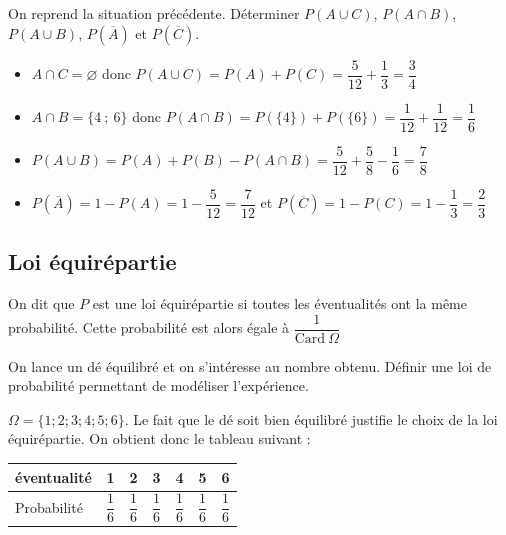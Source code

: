 \documentclass[french]{book}
\newcommand{\barre}[1]{\overline{#1}}
\begin{document}
\begin{exemple}
On reprend la situation pr\'ec\'edente.
D\'eterminer $P(A\cup C)$, $P(A\cap B)$, $P(A\cup B)$, $P(\barre{A})$ et $P(\barre{C})$.
\end{exemple}


\begin{itemize}
\item $A\cap C = \varnothing$ donc $P(A\cup C) = P(A)+P(C)= \dfrac{5}{12}+\dfrac{1}{3} = \dfrac{3}{4}$
\item $A \cap B = \{4~;~6\}$ donc $P(A\cap B) = P(\{4\})+P(\{6\}) = \dfrac{1}{12}+\dfrac{1}{12} = \dfrac{1}{6}$
\item $P(A\cup B) = P(A)+P(B)-P(A\cap B) = \dfrac{5}{12}+\dfrac{5}{8}-\dfrac{1}{6} = \dfrac{7}{8}$
\item $P(\barre{A}) = 1-P(A) = 1-\dfrac{5}{12} = \dfrac{7}{12}$
\quad et \quad $P(\barre{C}) = 1-P(C) = 1-\dfrac{1}{3} = \dfrac{2}{3}$
\end{itemize}


\subsection{Loi \'equir\'epartie}
\begin{defn}
On dit que $P$ est une loi \'equir\'epartie si toutes les \'eventualit\'es ont la m\^eme probabilit\'e. Cette probabilit\'e est alors \'egale à $\dfrac{1}{\text{Card}\ \Omega}$
\end{defn}

\begin{exemple}
On lance un d\'e \'equilibr\'e et on s'int\'eresse au nombre obtenu. D\'efinir une loi de probabilit\'e permettant de mod\'eliser l'exp\'erience.
\end{exemple}


$\Omega=\{1;2;3;4;5;6\}$. Le fait que le d\'e soit bien \'equilibr\'e justifie le choix de la loi \'equir\'epartie. On obtient donc le tableau suivant :
\begin{center}
\begin{tabular}{|l|c|c|c|c|c|c|} \hline
\'eventualit\'e & 1 & 2 & 3 & 4 & 5 & 6 \\ \hline
Probabilit\'e & $\dfrac{1}{6}$ & $\dfrac{1}{6}$ & $\dfrac{1}{6}$ & $\dfrac{1}{6}$ & $\dfrac{1}{6}$ & $\dfrac{1}{6}$ \\ \hline
\end{tabular}
\end{center}
\end{document}
